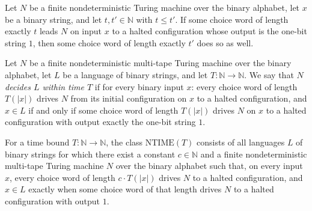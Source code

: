 \begin{theorem}
\label{Turing.FinNDTM.AcceptsWithin.mono}
\leanok
{}
Let $N$ be a finite nondeterministic Turing machine over the binary alphabet, let $x$ be
a binary string, and let $t,t'\in\mathbb{N}$ with $t\le t'$. If some choice word of
length exactly $t$ leads $N$ on input $x$ to a halted configuration whose output is the
one-bit string $1$, then some choice word of length exactly $t'$ does so as well.
\end{theorem}

\begin{definition}
\label{Turing.FinNDTM.DecidesInTime}
\leanok
{}
Let $N$ be a finite nondeterministic multi-tape Turing machine over the binary
alphabet, let $L$ be a language of binary strings, and let
$T : \mathbb{N} \to \mathbb{N}$. We say that $N$ \emph{decides $L$ within time $T$} if
for every binary input $x$: every choice word of length $T(|x|)$ drives $N$ from its
initial configuration on $x$ to a halted configuration, and $x \in L$ if and only if
some choice word of length $T(|x|)$ drives $N$ on $x$ to a halted configuration with
output exactly the one-bit string $1$.
\end{definition}

\begin{definition}
\label{Complexity.NTIME}
\leanok
{}
For a time bound $T : \mathbb{N} \to \mathbb{N}$, the class $\mathrm{NTIME}(T)$
consists of all languages $L$ of binary strings for which there exist a constant
$c \in \mathbb{N}$ and a finite nondeterministic multi-tape Turing machine $N$ over the
binary alphabet such that, on every input $x$, every choice word of length
$c \cdot T(|x|)$ drives $N$ to a halted configuration, and $x \in L$ exactly when some
choice word of that length drives $N$ to a halted configuration with output $1$.
\end{definition}

